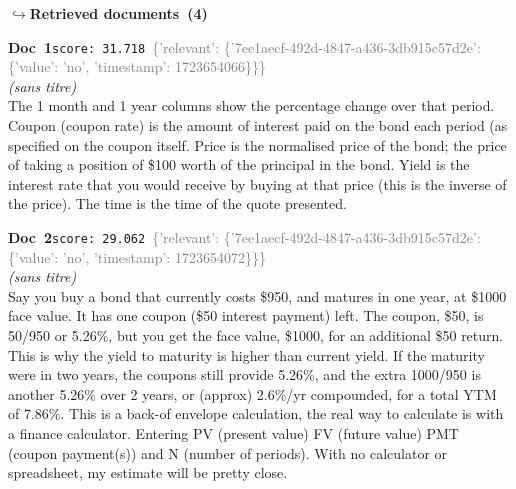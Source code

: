 \documentclass[a4paper,11pt]{article}
\begin{document}
\noindent\hfill{\footnotesize\textcolor{doccolor}{\textbf{$\hookrightarrow$\enspace Retrieved documents~(4)}}}
\begin{docenv}
{\footnotesize\textcolor{doccolor}{\textbf{Doc~1}}}\hfill{\tiny\texttt{score:~31.718}}\ {\tiny\textcolor{gray}{\{'relevant': \{'7ee1aecf-492d-4847-a436-3db915c57d2e': \{'value': 'no', 'timestamp': 1723654066\}\}\}}}\\[3pt]
{\small\textit{(sans titre)}}\\[2pt]
\vspace{2pt}
{\footnotesize 
The 1 month and 1 year columns show the percentage change over that period. Coupon (coupon rate) is the amount of interest paid on the bond each period (as specified on the coupon itself. Price is the normalised price of the bond; the price of taking a position of \$100 worth of the principal in the bond. Yield is the interest rate that you would receive by buying at that price (this is the inverse of the price). The time is the time of the quote presented.}
\end{docenv}
\begin{docenv}
{\footnotesize\textcolor{doccolor}{\textbf{Doc~2}}}\hfill{\tiny\texttt{score:~29.062}}\ {\tiny\textcolor{gray}{\{'relevant': \{'7ee1aecf-492d-4847-a436-3db915c57d2e': \{'value': 'no', 'timestamp': 1723654072\}\}\}}}\\[3pt]
{\small\textit{(sans titre)}}\\[2pt]
\vspace{2pt}
{\footnotesize 
Say you buy a bond that currently costs \$950, and matures in one year, at \$1000 face value. It has one coupon (\$50 interest payment) left. The coupon, \$50, is 50/950 or 5.26\%, but you get the face value, \$1000, for an additional \$50 return. This is why the yield to maturity is higher than current yield. If the maturity were in two years, the coupons still provide 5.26\%, and the extra 1000/950 is another 5.26\% over 2 years, or (approx) 2.6\%/yr compounded, for a total YTM of 7.86\%. This is a back-of envelope calculation, the real way to calculate is with a finance calculator. Entering PV (present value) FV (future value) PMT (coupon payment(s)) and N (number of periods). With no calculator or spreadsheet, my estimate will be pretty close.}
\end{docenv}
\end{document}
